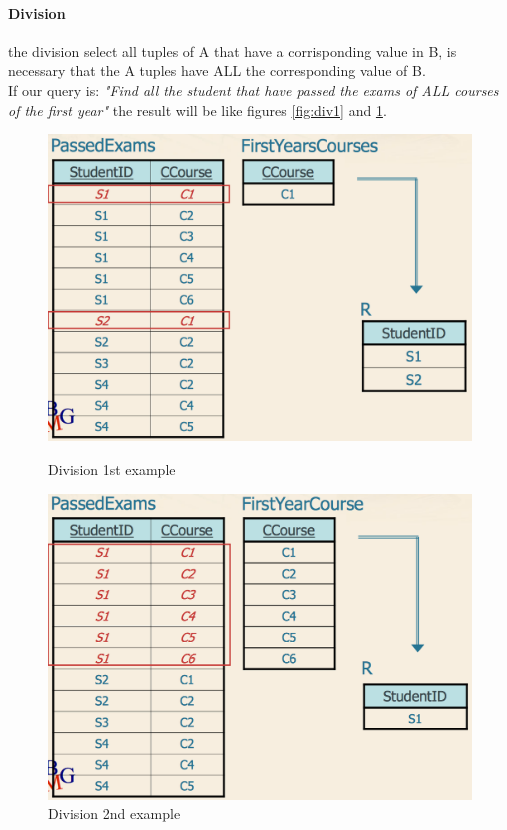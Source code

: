 \documentclass[12pt]{article}
\begin{document}
\paragraph{Division} the division select all tuples of A that have a corrisponding value in B, is necessary that the A tuples have ALL the corresponding value of B.\\
If our query is: \textit{"Find all the student that have passed the exams of ALL courses of the first year"} the result will be like figures \ref{fig:div1} and \ref{fig:div2}.
\begin{figure}[H]
  \centering
  \begin{minipage}{.45\textwidth}
    \centering
    \includegraphics[width=\textwidth]{images/div1.png}
    \caption{Division 1st example}
    \label{fig:div1}
  \end{minipage}\hfill
  \begin{minipage}{.45\textwidth}
    \centering
    \includegraphics[width=\textwidth]{images/div2.png}
    \caption{Division 2nd example}
    \label{fig:div2}
  \end{minipage}\hfill
\end{figure}





\end{document}
